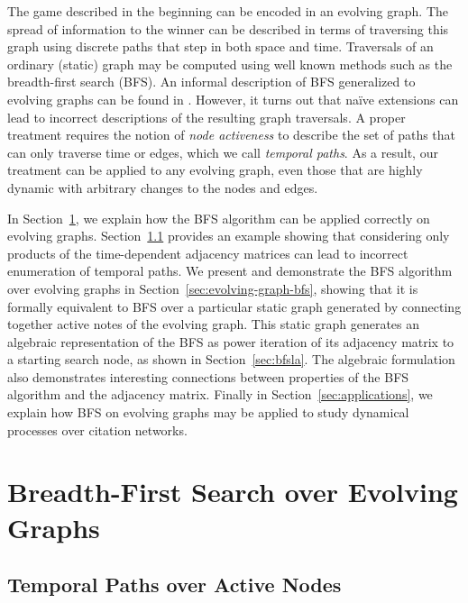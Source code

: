 \documentclass[10pt,conference,compsocconf]{IEEEtran}
\theoremstyle{definition}
\begin{document}
The game described in the beginning can be encoded in an evolving graph.
The spread of information to the winner can be described in terms of traversing
this graph using discrete paths that step in both space and time.
Traversals of an ordinary (static) graph may be computed using well known methods
such as the breadth-first search (BFS). An informal description of BFS generalized
to evolving graphs can be found in \cite{tmml09}.
However, it turns out that na\"ive extensions can lead to incorrect descriptions of
the resulting graph traversals. A proper treatment requires the notion of
\emph{node activeness} to describe the set of paths that can only traverse time
or edges, which we call \textit{temporal paths}.
As a result, our treatment can be applied to any evolving graph, even those that
are highly dynamic with arbitrary changes to the nodes and edges.

In Section~\ref{sec:breadth-first-search}, we explain how the BFS algorithm can be applied correctly on
evolving graphs. Section~\ref{sec:temporal-paths} provides an example showing that considering
only products of the time-dependent adjacency matrices can lead to incorrect enumeration
of temporal paths. We present and demonstrate the BFS algorithm over evolving graphs
in Section~\ref{sec:evolving-graph-bfs}, showing that it is formally equivalent to
BFS over a particular static graph generated by connecting
together active notes of the evolving graph. This static graph generates an algebraic
representation of the BFS as power iteration of its adjacency matrix to a starting
search node, as shown in Section~\ref{sec:bfsla}. The algebraic formulation also
demonstrates interesting connections between properties of the BFS algorithm and
the adjacency matrix. Finally in Section~\ref{sec:applications},
we explain how BFS on evolving graphs may be applied to study dynamical processes
over citation networks.


\section{Breadth-First Search over Evolving Graphs}
\label{sec:breadth-first-search}


\subsection{Temporal Paths over Active Nodes}
\label{sec:temporal-paths}
\end{document}
